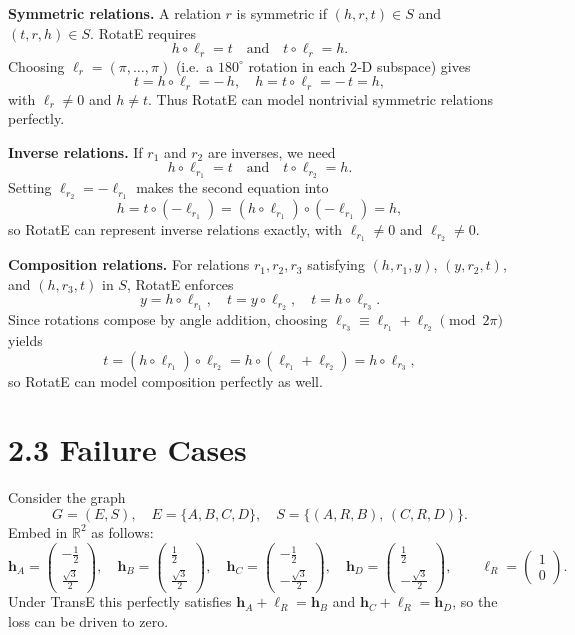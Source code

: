 \documentclass[a4paper,12pt]{article}
\begin{document}
\noindent\textbf{Symmetric relations.}  
A relation \(r\) is symmetric if \((h,r,t)\in S\) and \((t,r,h)\in S\).  RotatE requires  
\[
h\circ \ell_r = t
\quad\text{and}\quad
t\circ \ell_r = h.
\]  
Choosing \(\ell_r=(\pi,\dots,\pi)\) (i.e.\ a \(180^\circ\) rotation in each 2‑D subspace) gives  
\[
t = h\circ \ell_r = -\,h,
\quad
h = t\circ \ell_r = -\,t = h,
\]  
with \(\ell_r\neq0\) and \(h\neq t\).  Thus RotatE can model nontrivial symmetric relations perfectly.

\medskip
\noindent\textbf{Inverse relations.}  
If \(r_1\) and \(r_2\) are inverses, we need  
\[
h\circ \ell_{r_1} = t
\quad\text{and}\quad
t\circ \ell_{r_2} = h.
\]  
Setting \(\ell_{r_2}=-\ell_{r_1}\) makes the second equation into  
\[
h = t\circ(-\ell_{r_1})
= (h\circ\ell_{r_1})\circ(-\ell_{r_1}) = h,
\]  
so RotatE can represent inverse relations exactly, with \(\ell_{r_1}\neq0\) and \(\ell_{r_2}\neq0\).

\medskip
\noindent\textbf{Composition relations.}  
For relations \(r_1,r_2,r_3\) satisfying  
\((h,r_1,y)\), \((y,r_2,t)\), and \((h,r_3,t)\) in \(S\), RotatE enforces  
\[
y = h\circ \ell_{r_1},
\quad
t = y\circ \ell_{r_2},
\quad
t = h\circ \ell_{r_3}.
\]  
Since rotations compose by angle addition, choosing  
\(\ell_{r_3} \equiv \ell_{r_1} + \ell_{r_2}\pmod{2\pi}\)  
yields  
\[
t = (h\circ \ell_{r_1})\circ \ell_{r_2}
= h\circ(\ell_{r_1}+\ell_{r_2})
= h\circ \ell_{r_3},
\]  
so RotatE can model composition perfectly as well.



\section*{2.3 Failure Cases}
Consider the graph
\[
G=(E,S),\quad 
E=\{A,B,C,D\},\quad
S=\{(A,R,B),\,(C,R,D)\}.
\]
Embed in \(\mathbb R^2\) as follows:
\[
\mathbf{h}_A=\begin{pmatrix}-\tfrac12\\[3pt]\tfrac{\sqrt3}{2}\end{pmatrix},\quad
\mathbf{h}_B=\begin{pmatrix}\tfrac12\\[3pt]\tfrac{\sqrt3}{2}\end{pmatrix},\quad
\mathbf{h}_C=\begin{pmatrix}-\tfrac12\\[3pt]-\tfrac{\sqrt3}{2}\end{pmatrix},\quad
\mathbf{h}_D=\begin{pmatrix}\tfrac12\\[3pt]-\tfrac{\sqrt3}{2}\end{pmatrix},
\qquad
\boldsymbol{\ell}_R=\begin{pmatrix}1\\0\end{pmatrix}.
\]
Under TransE this perfectly satisfies
\(\mathbf{h}_A+\boldsymbol{\ell}_R=\mathbf{h}_B\) and
\(\mathbf{h}_C+\boldsymbol{\ell}_R=\mathbf{h}_D\), so the loss can be driven to zero.
\end{document}
